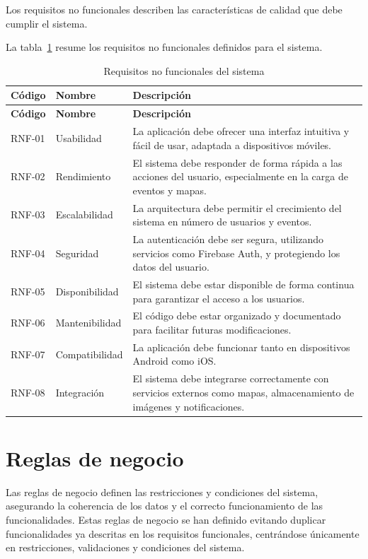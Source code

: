 Los requisitos no funcionales describen las características de calidad que debe cumplir el sistema.

La tabla~\ref{tab:requisitos_no_funcionales} resume los requisitos no funcionales definidos para el sistema.

{\renewcommand{\arraystretch}{1.18}
\begin{longtable}{@{}>{\raggedright\arraybackslash}p{} >{\raggedright\arraybackslash}p{} >{\raggedright\arraybackslash}p{}@{}}
\caption{Requisitos no funcionales del sistema}
\label{tab:requisitos_no_funcionales}\\
\toprule
\textbf{Código} & \textbf{Nombre} & \textbf{Descripción} \\
\midrule
\endfirsthead
\toprule
\textbf{Código} & \textbf{Nombre} & \textbf{Descripción} \\
\midrule
\endhead
\bottomrule
\endfoot
RNF-01 & Usabilidad & La aplicación debe ofrecer una interfaz intuitiva y fácil de usar, adaptada a dispositivos móviles. \\
RNF-02 & Rendimiento & El sistema debe responder de forma rápida a las acciones del usuario, especialmente en la carga de eventos y mapas. \\
RNF-03 & Escalabilidad & La arquitectura debe permitir el crecimiento del sistema en número de usuarios y eventos. \\
RNF-04 & Seguridad & La autenticación debe ser segura, utilizando servicios como Firebase Auth, y protegiendo los datos del usuario. \\
RNF-05 & Disponibilidad & El sistema debe estar disponible de forma continua para garantizar el acceso a los usuarios. \\
RNF-06 & Mantenibilidad & El código debe estar organizado y documentado para facilitar futuras modificaciones. \\
RNF-07 & Compatibilidad & La aplicación debe funcionar tanto en dispositivos Android como iOS. \\
RNF-08 & Integración & El sistema debe integrarse correctamente con servicios externos como mapas, almacenamiento de imágenes y notificaciones. \\
\end{longtable}
}

\section{Reglas de negocio}

Las reglas de negocio definen las restricciones y condiciones del sistema, asegurando la coherencia de los datos y el correcto funcionamiento de las funcionalidades. Estas reglas de negocio se han definido evitando duplicar funcionalidades ya descritas en los requisitos funcionales, centrándose únicamente en restricciones, validaciones y condiciones del sistema.

